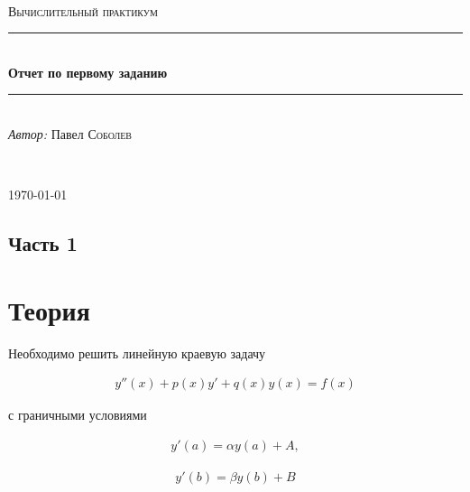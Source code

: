 



\begin{titlepage}

    \newcommand{\HRule}{\rule{\linewidth}{0.5mm}}

    \center

    \ \\[6.5cm]

    \textsc{\Large Вычислительный практикум}\\[0.5cm]

    \HRule\\[0.4cm]

    {\huge\bfseries Отчет по первому заданию}\\[0.4cm]

    \HRule\\[0.5cm]

    \large
    \textit{Автор:} Павел \textsc{Соболев}

    \ \\[0.9cm]
    \vfill\vfill\vfill

    {\large\today}

    \vfill

\end{titlepage}

\subsection*{Часть 1}
\section*{Теория}

\vspace{18pt}

Необходимо решить линейную краевую задачу

\hs
\begin{gather}
    y''(x) + p(x) y' + q(x) y(x) = f(x)
\end{gather}

с граничными условиями

\hs
\begin{gather}
    y'(a) = \alpha y(a) + A,
\end{gather}

\begin{gather}
    y'(b) = \beta y(b) + B
\end{gather}

